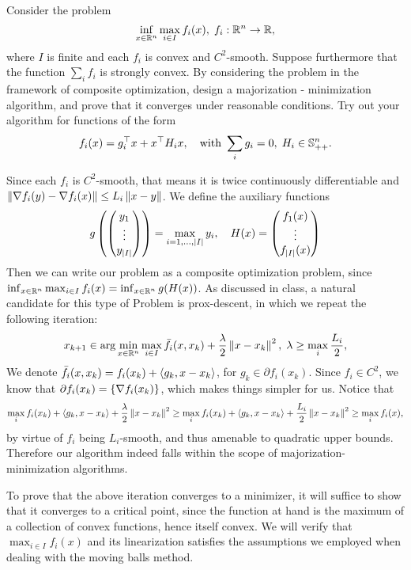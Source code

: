 \documentclass[10pt]{article}
\begin{document}
\begin{Exercise}
    Consider the problem
    \[
        \inf_{x \in \mathbb{R}^n} \max_{i \in I} f_i(x), \;
        f_i : \mathbb{R}^n \to \mathbb{R},
    \]
    where $I$ is finite and each $f_i$ is convex and $C^2$-smooth. Suppose
    furthermore that the function $\sum_i f_i$ is strongly convex. By
    considering the problem in the framework of composite optimization, design
    a majorization - minimization algorithm, and prove that it converges under
    reasonable conditions. Try out your algorithm for functions of the form
    \[
        f_i(x) = g_i^\top x + x^\top H_i x, \quad \text{with }
        \sum_i g_i = 0, \; H_i \in \mathbb{S}_{++}^n.
    \]
\end{Exercise}
\begin{Answer}
    Since each $f_i$ is $C^2$-smooth, that means it is twice continuously
    differentiable and $\left \| \nabla f_i (y) - \nabla f_i (x) \right \| \leq L_i \left \| x -
    y \right \|$. We define the auxiliary functions
    \[
        g\left(
            \begin{pmatrix} y_1 \\ \vdots \\ y_{\left| I \right|} \end{pmatrix}
        \right) = \max_{i=1, \dots, \left| I \right|} y_i, \quad
        H(x) = \begin{pmatrix} 
            f_1(x) \\ \vdots \\ f_{\left| I \right|}(x) \end{pmatrix}
    \]
    Then we can write our problem as a composite optimization problem, since
    $\inf_{x \in \mathbb{R}^n} \max_{i \in I} f_i(x) = \inf_{x \in \mathbb{R}^n} g(H(x))$.
    As discussed in class, a natural candidate for this type of Problem is
    prox-descent, in which we repeat the following iteration:
    \[
        x_{k+1} \in \arg \min_{x \in \mathbb{R}^n} \max_{i \in I} \bar{f}_i(x, x_k) +
        \frac{\lambda}{2} \left \| x - x_k \right \|^2, \; \lambda \geq \max_i
        \frac{L_i}{2},
    \]
    We denote $\bar{f}_i(x, x_k) = f_i(x_k) + \left\langle g_k, x - x_k \right\rangle$, for $g_k \in
    \partial f_i(x_k)$. Since $f_i \in C^2$, we know that $\partial f_i(x_k)
    = \left\{ \nabla f_i(x_k) \right\}$, which makes things simpler for us. Notice that
    \[
        \max_i f_i(x_k) + \left\langle g_k, x - x_k \right\rangle + \frac{\lambda}{2}
        \left \| x - x_k \right \|^2 \geq \max_i f_i(x_k) + \left\langle g_k, x - x_k \right\rangle
        + \frac{L_i}{2} \left \| x - x_k \right \|^2 \geq \max_i f_i(x),
    \]
    by virtue of $f_i$ being $L_i$-smooth, and thus amenable to quadratic upper
    bounds. Therefore our algorithm indeed falls within the scope of
    majorization-minimization algorithms.

    To prove that the above iteration converges to a minimizer, it will suffice
    to show that it converges to a critical point, since the function at hand
    is the maximum of a collection of convex functions, hence itself convex. We
    will verify that $\max_{i \in I} f_i(x)$ and its linearization satisfies
    the assumptions we employed when dealing with the moving balls method.


\end{Answer}
\end{document}
